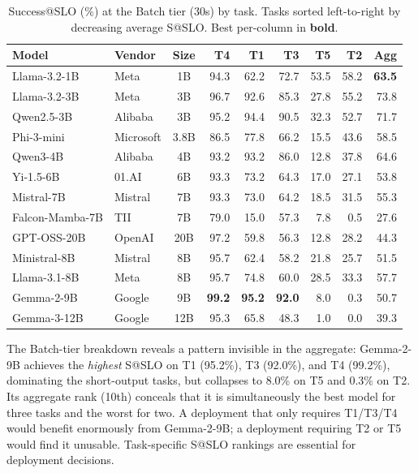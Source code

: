 \documentclass[11pt]{article}
\begin{document}
\begin{table}[h]
\centering
\caption{Success@SLO (\%) at the Batch tier (30s) by task.  Tasks sorted left-to-right by decreasing average S@SLO.  Best per-column in \textbf{bold}.}
\label{tab:batch-per-task}
\small
\begin{tabular}{llc rrrrr r}
\toprule
\textbf{Model} & \textbf{Vendor} & \textbf{Size} & \textbf{T4} & \textbf{T1} & \textbf{T3} & \textbf{T5} & \textbf{T2} & \textbf{Agg} \\
\midrule
Llama-3.2-1B    & Meta      & 1B   & 94.3 & 62.2 & 72.7 & 53.5 & 58.2 & \textbf{63.5} \\
Llama-3.2-3B    & Meta      & 3B   & 96.7 & 92.6 & 85.3 & 27.8 & 55.2 & 73.8 \\
Qwen2.5-3B      & Alibaba   & 3B   & 95.2 & 94.4 & 90.5 & 32.3 & 52.7 & 71.7 \\
Phi-3-mini       & Microsoft & 3.8B & 86.5 & 77.8 & 66.2 & 15.5 & 43.6 & 58.5 \\
Qwen3-4B         & Alibaba   & 4B   & 93.2 & 93.2 & 86.0 & 12.8 & 37.8 & 64.6 \\
Yi-1.5-6B        & 01.AI     & 6B   & 93.3 & 73.2 & 64.3 & 17.0 & 27.1 & 53.8 \\
Mistral-7B       & Mistral   & 7B   & 93.3 & 73.0 & 64.2 & 18.5 & 31.5 & 55.3 \\
Falcon-Mamba-7B  & TII       & 7B   & 79.0 & 15.0 & 57.3 & 7.8  & 0.5  & 27.6 \\
GPT-OSS-20B      & OpenAI    & 20B  & 97.2 & 59.8 & 56.3 & 12.8 & 28.2 & 44.3 \\
Ministral-8B     & Mistral   & 8B   & 95.7 & 62.4 & 58.2 & 21.8 & 25.7 & 51.5 \\
Llama-3.1-8B     & Meta      & 8B   & 95.7 & 74.8 & 60.0 & 28.5 & 33.3 & 57.7 \\
Gemma-2-9B       & Google    & 9B   & \textbf{99.2} & \textbf{95.2} & \textbf{92.0} & 8.0  & 0.3  & 50.7 \\
Gemma-3-12B      & Google    & 12B  & 95.3 & 65.8 & 48.3 & 1.0  & 0.0  & 39.3 \\
\bottomrule
\end{tabular}
\end{table}

The Batch-tier breakdown reveals a pattern invisible in the aggregate: Gemma-2-9B achieves the \emph{highest} S@SLO on T1 (95.2\%), T3 (92.0\%), and T4 (99.2\%), dominating the short-output tasks, but collapses to 8.0\% on T5 and 0.3\% on T2.  Its aggregate rank (10th) conceals that it is simultaneously the best model for three tasks and the worst for two.  A deployment that only requires T1/T3/T4 would benefit enormously from Gemma-2-9B; a deployment requiring T2 or T5 would find it unusable.  Task-specific S@SLO rankings are essential for deployment decisions.
\end{document}
